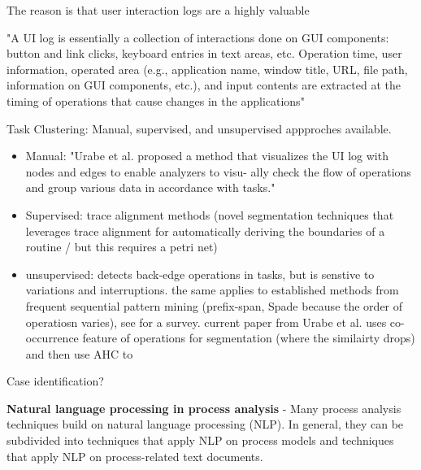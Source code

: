 \documentclass{scrartcl}
\begin{document}
The reason is that user interaction logs are a highly valuable 

"A UI log is essentially a collection of interactions done on GUI components: button and link clicks, keyboard entries in text areas, etc. Operation time, user information, operated area (e.g., application name, window title, URL, file path, information on GUI components, etc.), and input contents are extracted at the timing of operations that cause changes in the applications" \cite{Urabe21}

Task Clustering: Manual, supervised, and unsupervised appproches available.
\begin{itemize}
\item Manual: "Urabe et al. proposed a method that visualizes the UI log with nodes and edges to enable analyzers to visu- ally check the flow of operations and group various data in accordance with tasks." \cite{urabe2019visualizing}
\item Supervised: trace alignment methods \cite{agostinelli202111} (novel segmentation techniques that leverages trace alignment for automatically deriving the boundaries of a routine / but this requires a petri net)  
\item unsupervised: \cite{leno2020identifying} detects back-edge operations in tasks, but is senstive to variations and interruptions. the same applies to established methods from frequent sequential pattern mining (prefix-span, Spade because the order of operatiosn varies), see \cite{fournier2017survey} for a survey. current paper from Urabe et al. \cite{Urabe21} uses co-occurrence feature of operations for segmentation (where the similairty drops) and then use AHC to 
\end{itemize}
 
Case identification?





\textbf{Natural language processing in process analysis} - Many process analysis techniques build on natural language processing (NLP). In general, they can be subdivided into techniques that apply NLP on process models and techniques that apply NLP on process-related text documents. 
\end{document}
